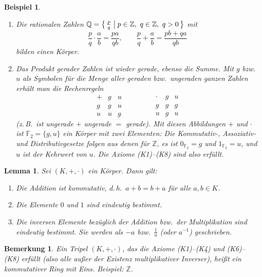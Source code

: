 \documentclass[a4paper]{article}
\theoremstyle{kurzskript}
\newtheorem{lemma}[satz]{Lemma}
\newtheorem{bemerkung}[satz]{Bemerkung}
\newtheorem{beispiel}[satz]{Beispiel}
\newcommand{\Z}{\mathbb{Z}}
\newcommand{\Q}{\mathbb{Q}}
\begin{document}
\begin{beispiel}
\leavevmode
\begin{enumerate}[label=(\arabic*)]
  \item Die rationalen Zahlen $\Q = \bigl\{\, \frac{p}{q} \bigm| p \in \Z,\ q \in \Z,\ q > 0 \,\bigr\}$ mit
  \[
    \frac{p}{q} \cdot \frac{a}{b} = \frac{pa}{qb}, \qquad \frac{p}{q} + \frac{a}{b} = \frac{pb + qa}{qb}
  \]
  bilden einen Körper.
  \item Das Produkt gerader Zahlen ist wieder gerade, ebenso die Summe. Mit $g$ bzw.\ $u$ als Symbolen für die Menge aller geraden bzw.\ ungeraden ganzen Zahlen erhält man die Rechenregeln
  \[
    \begin{array}{c|cc}
      + & g & u \\\hline
      g & g & u \\
      u & u & g
    \end{array}
    \qquad\qquad
    \begin{array}{c|cc}
      \cdot & g & u \\\hline
      g & g & g \\
      u & g & u
    \end{array}
  \]
  (z.\,B.\ ist \glqq ungerade $+$ ungerade $=$ gerade\grqq). Mit diesen Abbildungen $+$ und $\cdot$ ist $\mathbb{F}_2 = \{g, u\}$ ein Körper mit zwei Elementen: Die Kommutativ-, Assoziativ- und Distributivgesetze folgen aus denen für $\Z$, es ist $0_{\mathbb{F}_2} = g$ und $1_{\mathbb{F}_2} = u$, und $u$ ist der Kehrwert von $u$. Die Axiome (K1)--(K8) sind also erfüllt.
\end{enumerate}
\end{beispiel}

\begin{lemma}\label{lem:koerper}
Sei $(K, +, \cdot)$ ein Körper. Dann gilt:
\begin{enumerate}[label=(\arabic*)]
  \item Die Addition ist kommutativ, d.\,h.\ $a + b = b + a$ für alle $a, b \in K$.
  \item Die Elemente $0$ und $1$ sind eindeutig bestimmt.
  \item Die inversen Elemente bezüglich der Addition bzw.\ der Multiplikation sind eindeutig bestimmt. Sie werden als $-a$ bzw.\ $\frac{1}{a}$ (oder $a^{-1}$) geschrieben.
\end{enumerate}
\end{lemma}

\begin{bemerkung}
Ein Tripel $(K, +, \cdot)$, das die Axiome (K1)--(K4) und (K6)--(K8) erfüllt (also alle außer der Existenz multiplikativer Inverser), heißt ein \emph{kommutativer Ring mit Eins}. Beispiel: $\Z$.
\end{bemerkung}
\end{document}
